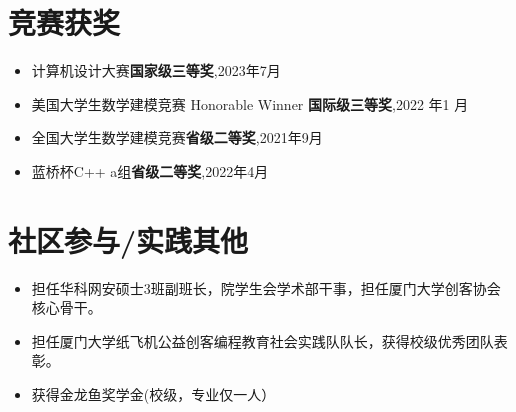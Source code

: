 \documentclass{resume}
\begin{document}
\section{竞赛获奖}
\begin{itemize}[parsep=0.2ex]
 \item 计算机设计大赛\textbf{国家级三等奖},2023年7月
  \item   美国大学生数学建模竞赛 Honorable Winner \textbf{国际级三等奖},2022 年1 月
  \item 全国大学生数学建模竞赛\textbf{省级二等奖},2021年9月
  \item 蓝桥杯C++ a组\textbf{省级二等奖},2022年4月

\end{itemize}



\section{社区参与/实践其他}
\begin{itemize}[parsep=0.2ex] 
  \item 担任华科网安硕士3班副班长，院学生会学术部干事，担任厦门大学创客协会核心骨干。
  \item 担任厦门大学纸飞机公益创客编程教育社会实践队队长，获得校级优秀团队表彰。
  \item 获得金龙鱼奖学金(校级，专业仅一人）
\end{itemize}

%
%
\end{document}
